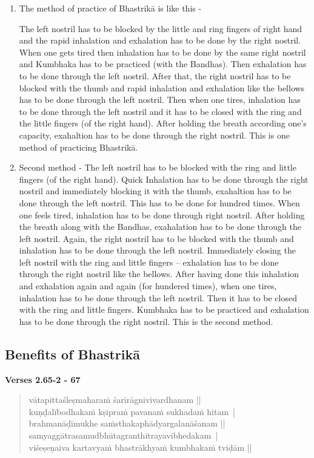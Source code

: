 \begin{enumerate}
\item The method of practice of Bhastrikā is like this -

The left nostril has to be blocked by the little and ring fingers of right hand and the rapid inhalation and exhalation has to be done by the right nostril. When one gets tired then inhalation has to be done by the same right nostril and Kumbhaka has to be practiced (with the Bandhas). Then exhalation has to be done through the left nostril. After that, the right nostril has to be blocked with the thumb and rapid inhalation and exhalation like the bellows has to be done through the left nostril. Then when one tires, inhalation has to be done through the left nostril and it has to be closed with the ring and the little fingers (of the right hand). After holding the breath according one’s capacity, exahaltion has to be done through the right nostril. This is one method of practicing Bhastrikā. 
\item Second method - The left nostril has to be blocked with the ring and little fingers (of the right hand). Quick Inhalation has to be done through the right nostril and immediately blocking it with the thumb, exahaltion has to be done through the left nostril.  This has to be done for hundred times. When one feels tired, inhalation has to be done through right nostril. After holding the breath along with the Bandhas, exahalation has to be done through the left nostril. Again, the right nostril has to be blocked with the thumb and inhalation has to be done through the left nostril. Immediately closing the left nostril with the ring and little fingers – exhalation has to be done through the right nostril like the bellows. After having done this inhalation and exhalation again and again (for hundered times), when one tires, inhalation has to be done through the left nostril. Then it has to be closed with the ring and little fingers. Kumbhaka has to be practiced and exhalation has to be done through the right nostril. This is the second method. 
\end{enumerate}
\newpage

\subsection*{Benefits of Bhastrikā}


\noindent \textbf{Verses 2.65-2 - 67}

\begin{verse}
vātapittaśleṣmaharaṁ śarīrāgnivivardhanam ||\\
kuṇḍalībodhakaṁ kṣipraṁ pavanaṁ sukhadaṁ hitam |\\
brahmanāḍīmukhe saṁsthakaphādyargalanāśanam ||\\
samyaggātrasamudbhūtagranthitrayavibhedakam |\\
viśeṣeṇaiva kartavyaṁ bhastrākhyaṁ kumbhakaṁ tviḍām ||
\end{verse}

